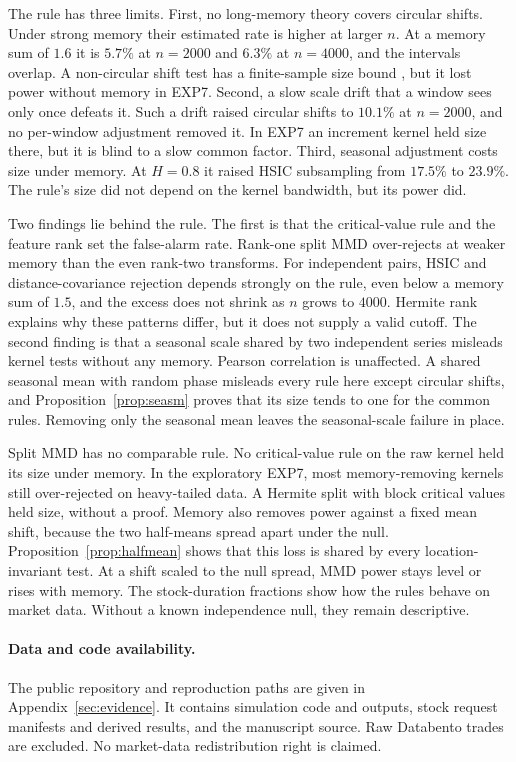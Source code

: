 \documentclass[11pt]{article}
\theoremstyle{remark}
\begin{document}
The rule has three limits. First, no long-memory theory covers circular shifts. Under strong memory their estimated rate is higher at larger $n$. At a memory sum of $1.6$ it is $5.7\%$ at $n=2000$ and $6.3\%$ at $n=4000$, and the intervals overlap. A non-circular shift test has a finite-sample size bound \citep{harris2020shift}, but it lost power without memory in EXP7. Second, a slow scale drift that a window sees only once defeats it. Such a drift raised circular shifts to $10.1\%$ at $n=2000$, and no per-window adjustment removed it. In EXP7 an increment kernel held size there, but it is blind to a slow common factor. Third, seasonal adjustment costs size under memory. At $H=0.8$ it raised HSIC subsampling from $17.5\%$ to $23.9\%$. The rule's size did not depend on the kernel bandwidth, but its power did.

Two findings lie behind the rule. The first is that the critical-value rule and the feature rank set the false-alarm rate. Rank-one split MMD over-rejects at weaker memory than the even rank-two transforms. For independent pairs, HSIC and distance-covariance rejection depends strongly on the rule, even below a memory sum of $1.5$, and the excess does not shrink as $n$ grows to $4000$. Hermite rank explains why these patterns differ, but it does not supply a valid cutoff. The second finding is that a seasonal scale shared by two independent series misleads kernel tests without any memory. Pearson correlation is unaffected. A shared seasonal mean with random phase misleads every rule here except circular shifts, and Proposition~\ref{prop:seasm} proves that its size tends to one for the common rules. Removing only the seasonal mean leaves the seasonal-scale failure in place.

Split MMD has no comparable rule. No critical-value rule on the raw kernel held its size under memory. In the exploratory EXP7, most memory-removing kernels still over-rejected on heavy-tailed data. A Hermite split with block critical values held size, without a proof. Memory also removes power against a fixed mean shift, because the two half-means spread apart under the null. Proposition~\ref{prop:halfmean} shows that this loss is shared by every location-invariant test. At a shift scaled to the null spread, MMD power stays level or rises with memory. The stock-duration fractions show how the rules behave on market data. Without a known independence null, they remain descriptive.

\paragraph{Data and code availability.} The public repository and reproduction paths are given in Appendix~\ref{sec:evidence}. It contains simulation code and outputs, stock request manifests and derived results, and the manuscript source. Raw Databento trades are excluded. No market-data redistribution right is claimed.
\end{document}
